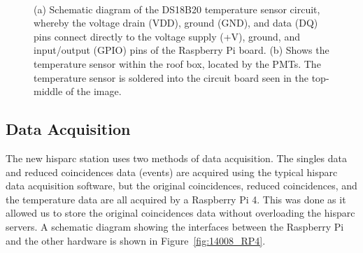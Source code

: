 \begin{figure}[htb!]
	\centering
	
	 \\
	
	\caption{(a) Schematic diagram of the DS18B20 temperature sensor circuit, whereby the voltage drain (VDD), ground (GND), and data (DQ) pins connect directly to the voltage supply (+V), ground, and input/output (GPIO) pins of the Raspberry Pi board. (b) Shows the temperature sensor within the roof box, located by the PMTs. The temperature sensor is soldered into the circuit board seen in the top-middle of the image.}
	\vspace{2em}
	\label{fig:temperature_sensor}
\end{figure}


\subsection{Data Acquisition}
\label{sec:HS14008_data_acqusition}

The new \gls{hisparc} station uses two methods of data acquisition. The singles data and reduced coincidences data (events) are acquired using the typical \gls{hisparc} data acquisition software, but the original coincidences, reduced coincidences, and the temperature data are all acquired by a Raspberry Pi 4. This was done as it allowed us to store the original coincidences data without overloading the \gls{hisparc} servers. A schematic diagram showing the interfaces between the Raspberry Pi and the other hardware is shown in Figure~\ref{fig:14008_RP4}.

